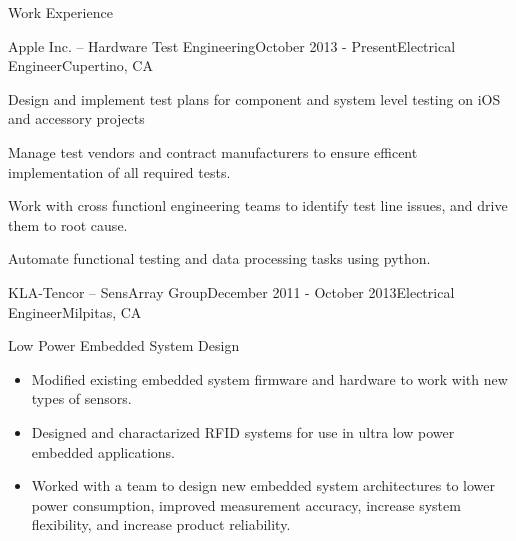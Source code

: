 \documentclass{resume} %
\begin{document}

\begin{rSection}{Work Experience}
\vspace{-0.5em}
\begin{rSubsection}{Apple Inc. -- Hardware Test Engineering}{October 2013 - Present}{Electrical Engineer}{Cupertino, CA}
\item Design and implement test plans for component and system level testing on iOS and accessory projects
\item Manage test vendors and contract manufacturers to ensure efficent implementation of all required tests.
\item Work with cross functionl engineering teams to identify test line issues, and drive them to root cause.
\item Automate functional testing and data processing tasks using python.
\end{rSubsection}


\begin{rSubsection2}{KLA-Tencor -- SensArray Group}{December 2011 - October 2013}{Electrical Engineer}{Milpitas, CA}
\item Low Power Embedded System Design 
\begin{itemize}
\itemsep -0.5em \vspace{-0.5em}
\renewcommand{\labelitemi}{-}
\item Modified existing embedded system firmware and hardware to work with new types of sensors.
\item Designed and charactarized RFID systems for use in ultra low power embedded applications.
\item Worked with a team to design new embedded system architectures to lower power consumption, improved measurement accuracy, increase system flexibility, and increase product reliability.
\end{itemize}


\end{rSubsection2}
\end{rSection}
\end{document}
